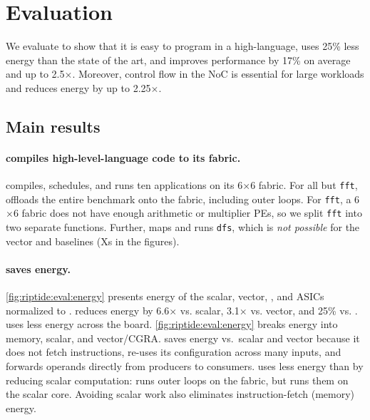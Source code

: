 \section{Evaluation}
\label{riptide:eval}

\figRipTidePrimaryArchResults
\figRipTidePrimaryCompilerResults
\figRipTideFINResults
\figRipTideLoCResults

We evaluate \riptide to show that it is easy to program in a high-language,
uses 25\% less energy than the state of the art,
and improves performance by 17\% on average and up to 2.5$\times$.
Moreover, control flow in the NoC is essential for large
workloads and reduces energy by up to 2.25$\times$.

\subsection{Main results}

\paragraph{\riptide compiles high-level-language code to its fabric.} \riptide
compiles, schedules, and runs ten applications on its 6$\times$6 fabric.
% 
For all but {\tt fft}, \riptide offloads the entire benchmark onto the fabric, including
outer loops.
% 
For {\tt fft}, a 6$\times$6 fabric does not have enough arithmetic or multiplier PEs,
so we split {\tt fft} into two separate functions. 
% 
Further, \riptide maps and runs {\tt dfs}, which is {\em not possible} for
the vector and \snafu baselines (Xs in the figures).

\paragraph{\riptide saves energy.}
\autoref{fig:riptide:eval:energy} presents energy of the scalar, vector, 
\snafu, and ASICs normalized to \riptide.
% 
\riptide reduces energy by 6.6$\times$ vs. scalar, 3.1$\times$ vs. vector, and 25\% vs. \snafu.
%
\riptide uses less energy across the board.
% 
\autoref{fig:riptide:eval:energy} breaks energy into memory, scalar, and vector/CGRA.
% 
\riptide saves energy vs.\ scalar and vector because it does not fetch instructions,
re-uses its configuration across many inputs, and forwards operands 
directly from producers to consumers.
% 
\riptide uses less energy than \snafu by reducing scalar computation:  \riptide runs
outer loops on the fabric, but \snafu runs them on the scalar core.
% 
Avoiding scalar work also eliminates instruction-fetch (memory) energy. 

